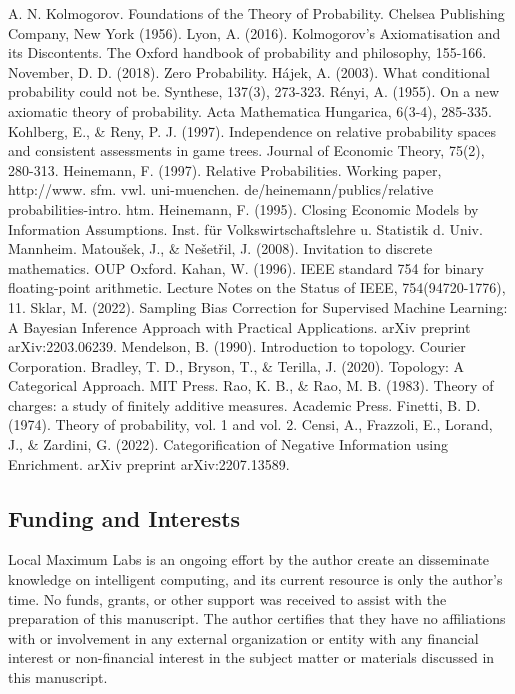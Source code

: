 \documentclass[twoside]{article}
\theoremstyle{plain}%
\theoremstyle{definition}
\theoremstyle{remark}
\begin{document}
\begin{thebibliography}{20}

A. N. Kolmogorov. Foundations of the Theory of Probability. Chelsea Publishing Company, New York
(1956). 
Lyon, A. (2016). Kolmogorov’s Axiomatisation and its Discontents. The Oxford handbook of probability and philosophy, 155-166.
November, D. D. (2018). Zero Probability.
Hájek, A. (2003). What conditional probability could not be. Synthese, 137(3), 273-323.
Rényi, A. (1955). On a new axiomatic theory of probability. Acta Mathematica Hungarica, 6(3-4), 285-335.
Kohlberg, E., \& Reny, P. J. (1997). Independence on relative probability spaces and consistent assessments in game trees. Journal of Economic Theory, 75(2), 280-313.
Heinemann, F. (1997). Relative Probabilities. Working paper, http://www. sfm. vwl. uni-muenchen. de/heinemann/publics/relative probabilities-intro. htm.
Heinemann, F. (1995). Closing Economic Models by Information Assumptions. Inst. für Volkswirtschaftslehre u. Statistik d. Univ. Mannheim.
Matoušek, J., \& Nešetřil, J. (2008). Invitation to discrete mathematics. OUP Oxford.
Kahan, W. (1996). IEEE standard 754 for binary floating-point arithmetic. Lecture Notes on the Status of IEEE, 754(94720-1776), 11.
Sklar, M. (2022). Sampling Bias Correction for Supervised Machine Learning: A Bayesian Inference Approach with Practical Applications. arXiv preprint arXiv:2203.06239.
Mendelson, B. (1990). Introduction to topology. Courier Corporation.
Bradley, T. D., Bryson, T., \& Terilla, J. (2020). Topology: A Categorical Approach. MIT Press.
Rao, K. B., \& Rao, M. B. (1983). Theory of charges: a study of finitely additive measures. Academic Press.
Finetti, B. D. (1974). Theory of probability, vol. 1 and vol. 2.
Censi, A., Frazzoli, E., Lorand, J., \& Zardini, G. (2022). Categorification of Negative Information using Enrichment. arXiv preprint arXiv:2207.13589.

\end{thebibliography}

\subsection*{Funding and Interests}

Local Maximum Labs is an ongoing effort by the author create an disseminate knowledge on intelligent computing, and its current resource is only the author's time. No funds, grants, or other support was received to assist with the preparation of this manuscript. The author certifies that they have no affiliations with or involvement in any external organization or entity with any financial interest or non-financial interest in the subject matter or materials discussed in this manuscript.
\end{document}
